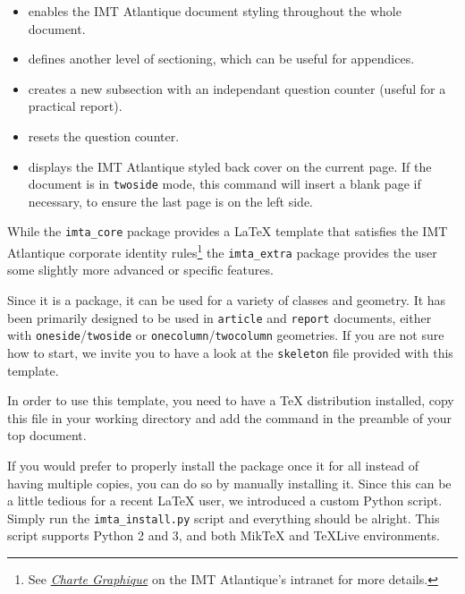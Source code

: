 \documentclass{report}
\begin{document}
\begin{itemize}
    \item {} enables the IMT Atlantique document styling throughout the whole document.
    
    \item {} defines another level of sectioning, which can be useful for appendices.
    
    \item {} creates a new subsection with an independant question counter (useful for a practical report).
    
    \item {} resets the question counter.
    
    \item {} displays the IMT Atlantique styled back cover on the current page. 
    If the document is in \texttt{twoside} mode, this command will insert a blank page if necessary, to ensure the last page is on the left side.
\end{itemize}






While the \texttt{imta\_core} package provides a \LaTeX{} template that satisfies the IMT Atlantique corporate identity rules\footnote{See \textit{\href{https://intranet.imt-atlantique.fr/wp-content/uploads/2017/01/imt_atlantique_chartegraphique.pdf}{Charte Graphique}} on the IMT Atlantique's intranet for more details.} the \texttt{imta\_extra} package provides the user some slightly more advanced or specific features.

Since it is a package, it can be used for a variety of classes and geometry. It has been primarily designed to be used in \texttt{article} and \texttt{report} documents, either with \texttt{oneside}/\texttt{twoside} or \texttt{onecolumn}/\texttt{twocolumn} geometries.
If you are not sure how to start, we invite you to have a look at the \texttt{skeleton} file provided with this template.



In order to use this template, you need to have a \TeX{} distribution installed, copy this file in your working directory and add the  command in the preamble of your top document.

If you would prefer to properly install the package once it for all instead of having multiple copies, you can do so by manually installing it. 
Since this can be a little tedious for a recent \LaTeX{} user, we introduced a custom Python script. 
Simply run the \texttt{imta\_install.py} script and everything should be alright.
This script supports Python 2 and 3, and both Mik\TeX{} and \TeX{}Live environments. 
\end{document}
